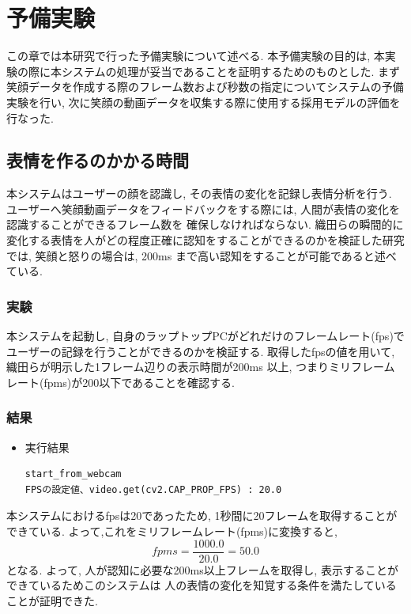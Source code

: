 \chapter{予備実験}
\label{chap:pre_experiment}

この章では本研究で行った予備実験について述べる.
本予備実験の目的は, 本実験の際に本システムの処理が妥当であることを証明するためのものとした.
まず笑顔データを作成する際のフレーム数および秒数の指定についてシステムの予備実験を行い,
次に笑顔の動画データを収集する際に使用する採用モデルの評価を行なった.
\section{表情を作るのかかる時間}
本システムはユーザーの顔を認識し, その表情の変化を記録し表情分析を行う.
ユーザーへ笑顔動画データをフィードバックをする際には, 人間が表情の変化を認識することができるフレーム数を
確保しなければならない.
織田らの瞬間的に変化する表情を人がどの程度正確に認知をすることができるのかを検証した研究では,
笑顔と怒りの場合は, 200m\/s まで高い認知をすることが可能であると述べている.\cite{織田朝美2005表情の瞬間的変化の認知}

\subsection{実験}
本システムを起動し, 自身のラップトップPCがどれだけのフレームレート(fps)でユーザーの記録を行うことができるのかを検証する.
取得したfpsの値を用いて, 織田らが明示した1フレーム辺りの表示時間が200ms  以上,
つまりミリフレームレート(fpms)が200以下であることを確認する.

\subsection{結果}
\begin{itemize}
\item 実行結果
\setlength{\parskip}{20pt}
\begin{lstlisting}
start_from_webcam
FPSの設定値、video.get(cv2.CAP_PROP_FPS) : 20.0
\end{lstlisting}
\end{itemize}
本システムにおけるfpsは20であったため, 1秒間に20フレームを取得することができている.
よって,これをミリフレームレート(fpms)に変換すると,
\begin{equation}
\label{fpms}
 fpms = \frac{1000.0}{20.0} = 50.0
\end{equation}
となる.
よって, 人が認知に必要な200ms以上フレームを取得し, 表示することができているためこのシステムは
人の表情の変化を知覚する条件を満たしていることが証明できた.


